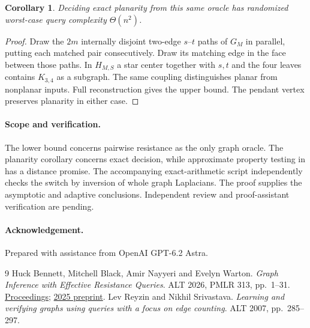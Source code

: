 \documentclass[11pt]{article}
\newtheorem{corollary}{Corollary}
\begin{document}
\begin{corollary}
Deciding exact planarity from this same oracle has randomized worst-case query complexity $\Theta(n^2)$.
\end{corollary}
\begin{proof}
Draw the $2m$ internally disjoint two-edge $s$--$t$ paths of $G_M$ in parallel, putting each matched pair consecutively. Draw its matching edge in the face between those paths. In $H_{M,S}$ a star center together with $s,t$ and the four leaves contains $K_{3,4}$ as a subgraph. The same coupling distinguishes planar from nonplanar inputs. Full reconstruction gives the upper bound. The pendant vertex preserves planarity in either case.
\end{proof}

\paragraph{Scope and verification.}
The lower bound concerns pairwise resistance as the only graph oracle. The planarity corollary concerns exact decision, while approximate property testing in \cite{bbnw} has a distance promise. The accompanying exact-arithmetic script independently checks the switch by inversion of whole graph Laplacians. The proof supplies the asymptotic and adaptive conclusions. Independent review and proof-assistant verification are pending.

\paragraph{Acknowledgement.} Prepared with assistance from OpenAI GPT-6.2 Astra.

\begin{thebibliography}{9}
 Huck Bennett, Mitchell Black, Amir Nayyeri and Evelyn Warton.
\emph{Graph Inference with Effective Resistance Queries}. ALT 2026, PMLR 313, pp.\ 1--31.
\href{https://proceedings.mlr.press/v313/warton26a.html}{Proceedings};
\href{https://arxiv.org/abs/2502.18350}{2025 preprint}.
 Lev Reyzin and Nikhil Srivastava.
\emph{Learning and verifying graphs using queries with a focus on edge counting}.
ALT 2007, pp.\ 285--297.
\end{thebibliography}
\end{document}
